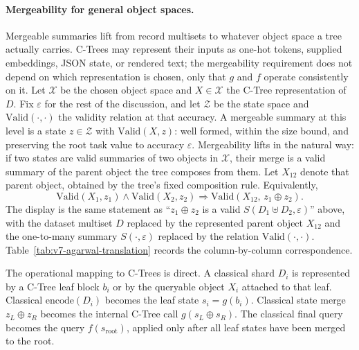 \paragraph{Mergeability for general object spaces.}
Mergeable summaries lift from record multisets to whatever object
space a tree actually carries. C-Trees may represent their inputs as
one-hot tokens, supplied embeddings, JSON state, or rendered text;
the mergeability requirement does not depend on which representation
is chosen, only that \(g\) and \(f\) operate consistently on it. Let
\(\mathcal{X}\) be the chosen object space and \(X\in\mathcal{X}\)
the C-Tree representation of \(D\). Fix \(\varepsilon\) for the rest
of the discussion, and let \(\mathcal{Z}\) be the state space and
\(\mathrm{Valid}(\cdot,\cdot)\) the validity relation at that
accuracy. A mergeable summary at this level is a state
\(z\in\mathcal{Z}\) with \(\mathrm{Valid}(X,z)\): well formed, within
the size bound, and preserving the root task value to accuracy
\(\varepsilon\). Mergeability lifts in the natural way: if two states
are valid summaries of two objects in \(\mathcal{X}\), their merge is
a valid summary of the parent object the tree composes from them. Let
\(X_{12}\) denote that parent object, obtained by the tree's fixed
composition rule. Equivalently,
\[
  \mathrm{Valid}(X_1,z_1)
  \wedge
  \mathrm{Valid}(X_2,z_2)
  \Longrightarrow
  \mathrm{Valid}(X_{12},\,z_1\oplus z_2).
\]
The display is the same statement as ``\(z_1\oplus z_2\) is a valid
\(S(D_1\uplus D_2,\varepsilon)\)'' above, with the dataset multiset
\(D\) replaced by the represented parent object \(X_{12}\) and the
one-to-many summary \(S(\cdot,\varepsilon)\) replaced by the relation
\(\mathrm{Valid}(\cdot,\cdot)\). Table~\ref{tab:v7-agarwal-translation}
records the column-by-column correspondence.

The operational mapping to C-Trees is direct. A classical shard
\(D_i\) is represented by a C-Tree leaf block \(b_i\) or by the
queryable object \(X_i\) attached to that leaf. Classical
\(\mathrm{encode}(D_i)\) becomes the leaf state \(s_i=g(b_i)\).
Classical state merge \(z_L\oplus z_R\) becomes the internal C-Tree
call \(g(s_L\oplus s_R)\). The classical final query becomes the
query \(f(s_{\mathrm{root}})\), applied only after all leaf states
have been merged to the root.

